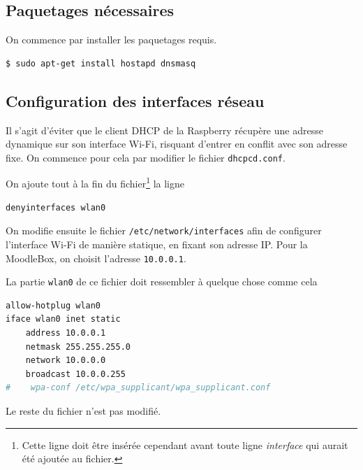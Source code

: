 \documentclass[11pt]{article}
\begin{document}
\subsection{Paquetages nécessaires}

On commence par installer les paquetages requis.
\begin{lstlisting}[language=bash]
$ sudo apt-get install hostapd dnsmasq
\end{lstlisting}

\subsection{Configuration des interfaces réseau}

Il s'agit d'éviter que le client DHCP de la Raspberry récupère une adresse dynamique sur son interface Wi-Fi, risquant d'entrer en conflit avec son adresse fixe. On commence pour cela par modifier le fichier \lstinline{dhcpcd.conf}.

On ajoute tout à la fin du fichier\footnote{Cette ligne doit être insérée cependant avant toute ligne \emph{interface} qui aurait été ajoutée au fichier.} la ligne
\begin{lstlisting}[language=bash]
denyinterfaces wlan0
\end{lstlisting}

On modifie ensuite le fichier \lstinline{/etc/network/interfaces} afin de configurer l'interface Wi-Fi de manière statique, en fixant son adresse IP. Pour la MoodleBox, on choisit l'adresse \lstinline{10.0.0.1}.

La partie \lstinline{wlan0} de ce fichier doit ressembler à quelque chose comme cela
\begin{lstlisting}[language=bash]
allow-hotplug wlan0
iface wlan0 inet static
    address 10.0.0.1
    netmask 255.255.255.0
    network 10.0.0.0
    broadcast 10.0.0.255
#    wpa-conf /etc/wpa_supplicant/wpa_supplicant.conf
\end{lstlisting}
Le reste du fichier n'est pas modifié.

\end{document}
